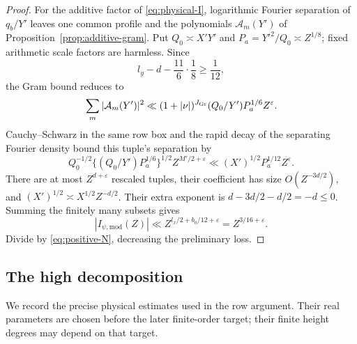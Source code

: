\documentclass[11pt,a4paper]{article}
\numberwithin{equation}{section}
\theoremstyle{definition}
\theoremstyle{remark}
\newcommand{\eps}{\varepsilon}
\begin{document}
\begin{proof}
For the additive factor of \eqref{eq:physical-I}, logarithmic Fourier
separation of $q_b/Y'$ leaves one common profile and the polynomials
$\mathcal A_m(Y')$ of Proposition~\ref{prop:additive-gram}.  Put
$Q_0\asymp X'Y'$ and $P_a=Y'^2/Q_0\asymp Z^{1/8}$; fixed arithmetic
scale factors are harmless.  Since
\[
 l_y-d-\frac{11}{6}\cdot\frac18\geq\frac1{12},
\]
the Gram bound reduces to
\begin{equation}\label{eq:gram-specialized}
 \sum_m|\mathcal A_m(Y')|^2
       \ll (1+|\nu|)^{J_{\rm Gr}}(Q_0/Y')P_a^{1/6}Z^\eps.
\end{equation}
Cauchy--Schwarz in the same row box and the rapid decay of the separating
Fourier density bound this tuple's separation by
\[
 Q_0^{-1/2}\{(Q_0/Y')P_a^{1/6}\}^{1/2}Z^{M'/2+\eps}
       \ll (X')^{1/2}P_a^{1/12}Z^\eps.
\]
There are at most $Z^{d+\eps}$ rescaled tuples, their coefficient has size
$O(Z^{-3d/2})$, and $(X')^{1/2}\asymp X^{1/2}Z^{-d/2}$.
Their extra exponent is $d-3d/2-d/2=-d\leq0$.
Summing the finitely many subsets gives
\[
 |I_{\psi,\mathrm{mod}}(Z)|
       \ll Z^{l_x/2+b_0/12+\eps}=Z^{3/16+\eps}.
\]
Divide by \eqref{eq:positive-N}, decreasing the preliminary loss.
\end{proof}

\subsection{The high decomposition}

We record the precise physical estimates used in the row argument.
Their real parameters are chosen before the later finite-order target;
their finite height degrees may depend on that target.
\end{document}
